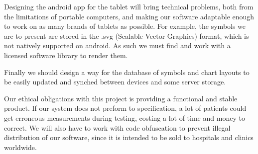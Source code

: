 Designing the android app for the tablet will bring technical problems, both from the limitations of portable computers, and making our software adaptable enough to work on as many brands of tablets as possible. For example, the symbols we are to present are stored in the .svg (Scalable Vector Graphics) format, which is not natively supported on android. As such we must find and work with a licensed software library to render them. 

Finally we should design a way for the database of symbols and chart layouts to be easily updated and synched between devices and some server storage. 


Our ethical obligations with this project is providing a functional and stable product. If our system does not preform to specification, a lot of patients could get erroneous measurements during testing, costing a lot of time and money to correct. We will also have to work with code obfuscation to prevent illegal distribution of our software, since it is intended to be sold to hospitals and clinics worldwide.